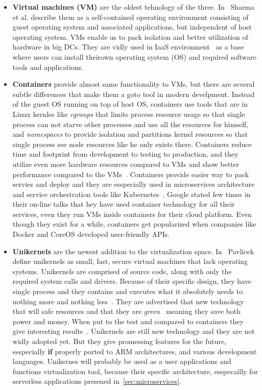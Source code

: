 \begin{itemize}
	\item \textbf{Virtual machines (VM)} are the oldest tehnology of the three. In~\cite{Sharma} Sharma et al. describe them as a self-contained operating environment consisting of guest operating system and associated applications, but independent of host operating system. VMs enable us to pack isolation and better utilization of hardware in big DCs. They are vidly used in IaaS environment~\cite{AbsalomBJ13, YangHCLW13} as a base where users can install theirown operating system (OS) and required software tools and applications.
	\item \textbf{Containers} provide almost same functionality to VMs, but there are several subtle differences that make them a goto tool in modern develpment. Instead of the guest OS running on top of host OS, containers use tools that are in Linux kernles like \textit{cgroups} that limits process resource usage so that single process can not starve other processes and use all the resources for himself, and \textit{namespaces} to provide isolation and partitions kernel resources so that single process see node resources like he only exists there. Containers reduce time and footprint from development to testing to production, and they utilize even more hardware resources compared to VMs and show better performance compared to the VMs~\cite{Seo2014PerformanceCA, FelterFRR15}. Containers provide easier way to pack servies and deploy and they are esspecially used in microservices architecture and service orchestration tools like Kubernetes~\cite{BurnsGOBW16}. Google stated few times in their on-line talks that hey have used container technology for all their services, even they run VMs inside containers for their cloud platform. Even though they exist for a while, containers get popularized when companies like Docker and CoreOS developed user-friendly APIs.
	\item \textbf{Unikernels} are the newest addition to the virtualization space. In~\cite{pavlicek2016unikernels} Pavlicek define unikernels as small, fast, secure virtual machines that lack operating systems. Unikernels are comprised of source code, along with only the required system calls and drivers. Because of their specific design, they have single process and they contains and executes what it absolutely needs to nothing more and nothing less~\cite{GoethalsSAVT18}. They are advertised that new technology that will safe resources and that they are \textit{green}~\cite{208735} meaning they save both power and money. When put to the test and compared to containers they give interesting results~\cite{GoethalsSAVT18, PlauthFP17}. Unikernels are still new technology and they are not widly adopted yet. But they give promessing features for the future, esspecially \textbf{if} properly ported to ARM architectures, and various development languages. Unikernes will probably be used as a user applications and functions virtualization tool, because their specific architecture, esspecailly for serverless applications presened in~\ref{sec:microservices}.
\end{itemize}

